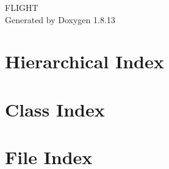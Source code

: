 \documentclass[twoside]{book}
\newcommand{\+}{\discretionary{\mbox{\scriptsize$\hookleftarrow$}}{}{}}
\newcommand{\clearemptydoublepage}{%
  \newpage{\pagestyle{empty}\cleardoublepage}%
}
\begin{document}
\hypersetup{pageanchor=false,
             bookmarksnumbered=true,
             pdfencoding=unicode
            }
\begin{titlepage}
\vspace*{7cm}
\begin{center}%
{\Large F\+L\+I\+G\+HT }\\
\vspace*{1cm}
{\large Generated by Doxygen 1.8.13}\\
\end{center}
\end{titlepage}
\clearemptydoublepage
{}
\tableofcontents
\clearemptydoublepage
{}
\hypersetup{pageanchor=true}

\chapter{Hierarchical Index}

\chapter{Class Index}

\chapter{File Index}

\end{document}
